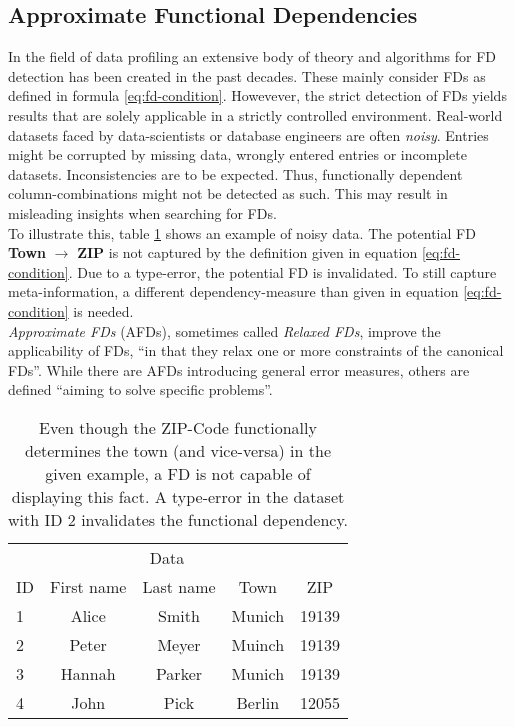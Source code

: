 \subsection{Approximate Functional Dependencies}
In the field of data profiling an extensive body of theory and algorithms for FD detection has been created in the past decades.\cite{PAP15}
These mainly consider FDs as defined in formula \ref{eq:fd-condition}.
Howevever, the strict detection of FDs yields results that are solely applicable in a strictly controlled environment.
Real-world datasets faced by data-scientists or database engineers are often \emph{noisy}.
Entries might be corrupted by missing data, wrongly entered entries or incomplete datasets.
Inconsistencies are to be expected.
Thus, functionally dependent column-combinations might not be detected as such. This may result in misleading insights when searching for FDs. \\

To illustrate this, table \ref{tab:example-afd-necessity} shows an example of noisy data.
The potential FD \textbf{Town} $\to$ \textbf{ZIP} is not captured by the definition given in equation \ref{eq:fd-condition}.
Due to a type-error, the potential FD is invalidated.
To still capture meta-information, a different dependency-measure than given in equation \ref{eq:fd-condition} is needed. \\

\emph{Approximate FDs} (AFDs), sometimes called \emph{Relaxed FDs}, improve the applicability of FDs, ``in that they relax one or more constraints of the canonical FDs''\cite[p.~1]{CAR16}. While there are AFDs introducing general error measures, others are defined ``aiming to solve specific problems''\cite[p.~1]{CAR16}. \\

\begin{table}[h]
	\centering
	\begin{tabular}{lcccc}
		\toprule
		& \multicolumn{3}{c}{Data} \\ \cmidrule(lr){2-5}
        ID & First name & Last name & Town & ZIP \\
		\midrule
        1 & Alice & Smith & Munich & 19139 \\
        2 & Peter & Meyer & Muinch & 19139 \\
        3 & Hannah & Parker & Munich & 19139  \\
        4 & John & Pick & Berlin & 12055 \\
		\bottomrule
	\end{tabular}
    \caption{Even though the ZIP-Code functionally determines the town (and vice-versa) in the given example, a FD is not capable of displaying this fact. A type-error in the dataset with ID 2 invalidates the functional dependency.}
	\label{tab:example-afd-necessity}
\end{table}

